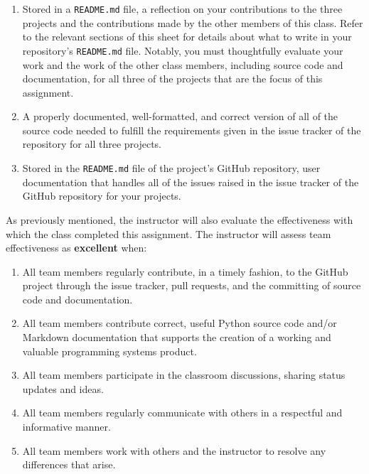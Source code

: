 \documentclass[11pt]{article}
\newcommand{\reflection}{\lstinline{README.md}}
\begin{document}
\begin{enumerate}

\setlength{\itemsep}{0in}

\item Stored in a \reflection{} file, a reflection on your contributions to the three projects and the contributions
  made by the other members of this class. Refer to the relevant sections of this sheet for details about what to write
  in your repository's \reflection{} file. Notably, you must thoughtfully evaluate your work and the work of the other
  class members, including source code and documentation, for all three of the projects that are the focus of this
  assignment.

\item A properly documented, well-formatted, and correct version of all of the source code needed to fulfill the
  requirements given in the issue tracker of the repository for all three projects.

\item Stored in the \reflection{} file of the project's GitHub repository, user documentation that handles all of the
  issues raised in the issue tracker of the GitHub repository for your projects.

\end{enumerate}

As previously mentioned, the instructor will also evaluate the effectiveness with which the class completed this
assignment. The instructor will assess team effectiveness as {\bf excellent} when:

\vspace*{-.5em}

\begin{enumerate}
  \setlength{\itemsep}{0pt}

  \item All team members regularly contribute, in a timely fashion, to the GitHub project through the issue tracker,
    pull requests, and the committing of source code and documentation.

  \item All team members contribute correct, useful Python source code and/or Markdown documentation that supports the
    creation of a working and valuable programming systems product.

  \item All team members participate in the classroom discussions, sharing status updates and ideas.

  \item All team members regularly communicate with others in a respectful and informative manner.

  \item All team members work with others and the instructor to resolve any differences that arise.

\end{enumerate}
\end{document}
